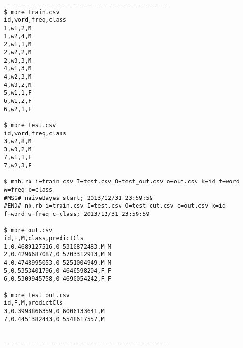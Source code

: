 \begin{verbatim}
------------------------------------------------
$ more train.csv
id,word,freq,class
1,w1,2,M
1,w2,4,M
2,w1,1,M
2,w2,2,M
2,w3,3,M
4,w1,3,M
4,w2,3,M
4,w3,2,M
5,w1,1,F
6,w1,2,F
6,w2,1,F

$ more test.csv
id,word,freq,class
3,w2,8,M
3,w3,2,M
7,w1,1,F
7,w2,3,F

$ mnb.rb i=train.csv I=test.csv O=test_out.csv o=out.csv k=id f=word w=freq c=class
#MSG# naiveBayes start; 2013/12/31 23:59:59
#END# nb.rb i=train.csv I=test.csv O=test_out.csv o=out.csv k=id f=word w=freq c=class; 2013/12/31 23:59:59

$ more out.csv 
id,F,M,class,predictCls
1,0.4689127516,0.5310872483,M,M
2,0.4296687087,0.5703312913,M,M
4,0.4748995053,0.5251004949,M,M
5,0.5353401796,0.4646598204,F,F
6,0.5309945758,0.4690054242,F,F

$ more test_out.csv
id,F,M,predictCls
3,0.3993866359,0.6006133641,M
7,0.4451382443,0.5548617557,M


------------------------------------------------
\end{verbatim}


%

